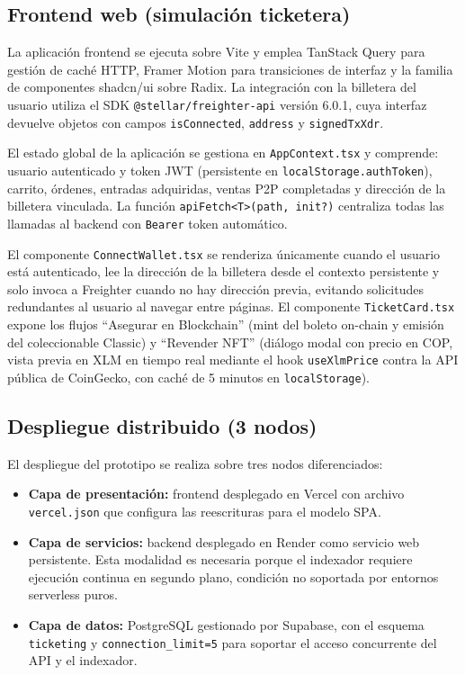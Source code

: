 \subsection{Frontend web (simulación ticketera)}

La aplicación frontend se ejecuta sobre Vite y emplea TanStack Query para gestión de caché HTTP, Framer Motion para transiciones de interfaz y la familia de componentes shadcn/ui sobre Radix. La integración con la billetera del usuario utiliza el SDK \texttt{@stellar/freighter-api} versión 6.0.1, cuya interfaz devuelve objetos con campos \texttt{isConnected}, \texttt{address} y \texttt{signedTxXdr}.

El estado global de la aplicación se gestiona en \texttt{AppContext.tsx} y comprende: usuario autenticado y token JWT (persistente en \texttt{localStorage.authToken}), carrito, órdenes, entradas adquiridas, ventas P2P completadas y dirección de la billetera vinculada. La función \texttt{apiFetch<T>(path, init?)} centraliza todas las llamadas al backend con \texttt{Bearer} token automático.

El componente \texttt{ConnectWallet.tsx} se renderiza únicamente cuando el usuario está autenticado, lee la dirección de la billetera desde el contexto persistente y solo invoca a Freighter cuando no hay dirección previa, evitando solicitudes redundantes al usuario al navegar entre páginas. El componente \texttt{TicketCard.tsx} expone los flujos ``Asegurar en Blockchain'' (mint del boleto on-chain y emisión del coleccionable Classic) y ``Revender NFT'' (diálogo modal con precio en COP, vista previa en XLM en tiempo real mediante el hook \texttt{useXlmPrice} contra la API pública de CoinGecko, con caché de 5 minutos en \texttt{localStorage}).

\subsection{Despliegue distribuido (3 nodos)}

El despliegue del prototipo se realiza sobre tres nodos diferenciados:

\begin{itemize}
    \item \textbf{Capa de presentación:} frontend desplegado en Vercel con archivo \texttt{vercel.json} que configura las reescrituras para el modelo SPA.
    \item \textbf{Capa de servicios:} backend desplegado en Render como servicio web persistente. Esta modalidad es necesaria porque el indexador requiere ejecución continua en segundo plano, condición no soportada por entornos serverless puros.
    \item \textbf{Capa de datos:} PostgreSQL gestionado por Supabase, con el esquema \texttt{ticketing} y \texttt{connection\_limit=5} para soportar el acceso concurrente del API y el indexador.
\end{itemize}

